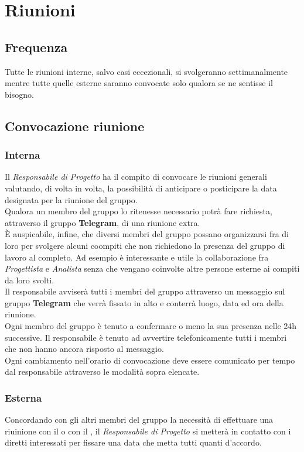 \section{Riunioni}
  \subsection{Frequenza}
    Tutte le riunioni interne, salvo casi eccezionali, si svolgeranno settimanalmente mentre tutte quelle esterne saranno convocate solo qualora se ne sentisse il bisogno.
  \subsection{Convocazione riunione}
    \subsubsection{Interna}
      Il \emph{Responsabile di Progetto} ha il compito di convocare le riunioni generali valutando, di volta in volta, la possibilità di anticipare o posticipare la data
      designata per la riunione del gruppo.\\
      Qualora un membro del gruppo lo ritenesse necessario potrà fare richiesta, attraverso il gruppo \textbf{Telegram}, di una riunione extra.\\
      È auspicabile, infine, che diversi membri del gruppo possano organizzarsi fra di loro per svolgere alcuni coompiti che non richiedono la presenza  del gruppo di lavoro
      al completo. Ad esempio è interessante e utile la collaborazione fra \emph{Progettista} e \emph{Analista} senza che vengano coinvolte altre persone esterne ai compiti
      da loro svolti.\\
      Il responsabile avviserà tutti i membri del gruppo attraverso un messaggio sul gruppo \textbf{Telegram} che verrà fissato in alto e conterrà luogo, data ed ora della riunione.\\
      Ogni membro del gruppo è tenuto a confermare o meno la sua presenza nelle 24h successive. Il responsabile è tenuto ad avvertire telefonicamente tutti i membri che
      non hanno ancora risposto al messaggio.\\
      Ogni cambiamento nell'orario di convocazione deve essere comunicato per tempo dal responsabile attraverso le modalità sopra elencate.
    \subsubsection{Esterna}
      Concordando con gli altri membri del gruppo la necessità di effettuare una riuinione con il  o con il , il \emph{Responsabile di Progetto}
      si metterà in contatto con i diretti interessati per fissare una data che metta tutti quanti d'accordo.
